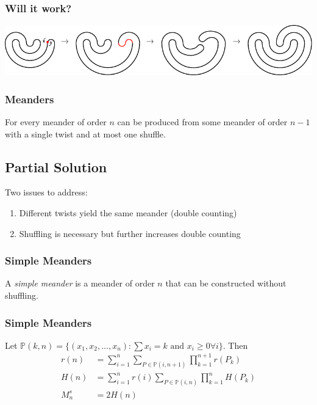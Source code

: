 \documentclass{beamer}
\begin{document}
\begin{frame}
\frametitle{Will it work?}
\begin{center}
\includegraphics[width=\textwidth]{meanders/5-shuffle.pdf}
\end{center}

\end{frame}

\begin{frame}
\frametitle{Meanders}
\begin{theorem}
For every meander of order $n$ can be produced from some meander of order $n-1$ with a single twist and at most one shuffle.
\end{theorem}
\end{frame}

\subsection{Partial Solution}
\begin{frame}
Two issues to address:
\begin{enumerate}
\item Different twists yield the same meander (double counting)
\item Shuffling is necessary but further increases double counting
\end{enumerate}
\end{frame}

\begin{frame}
\frametitle{Simple Meanders}
\begin{definition}
A \emph{simple meander} is a meander of order $n$ that can be constructed without shuffling.
\end{definition}
\end{frame}

\begin{frame}
\frametitle{Simple Meanders}
\renewcommand{\P}{\mathbb{P}}

\begin{theorem}
Let $\P(k,n) = \{(x_1,x_2,\ldots,x_n) : \sum x_i = k \text{ and } x_i\ge 0 \forall i\}$. Then
\begin{align*}
r(n) &= \sum_{i=1}^n\sum_{P\in\P(i,n+1)}\prod^{n+1}_{k = 1} r(P_k)\\
H(n) &= \sum_{i=1}^n r(i) \sum_{P\in\P(i,n)}\prod^{n}_{k = 1} H(P_k)\\
M^s_n &= 2H(n)
\end{align*}
\end{theorem}
\end{frame}
\end{document}

